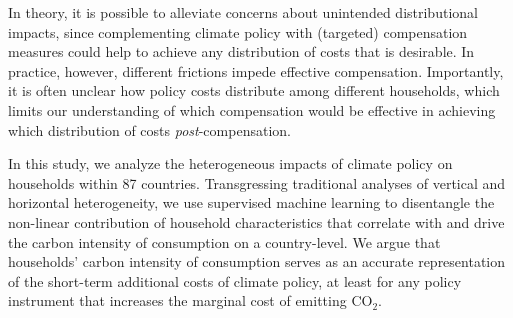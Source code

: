 \documentclass[12pt, a4paper]{article}
\begin{document}
In theory, it is possible to alleviate concerns about unintended distributional impacts, since complementing climate policy with (targeted) compensation measures could help to achieve any distribution of costs that is desirable. In practice, however, different frictions impede effective compensation. Importantly, it is often unclear how policy costs distribute among different households, which limits our understanding of which compensation would be effective in achieving which distribution of costs \textit{post}-compensation.


In this study, we analyze the heterogeneous impacts of climate policy on households within 87 countries. Transgressing traditional analyses of vertical and horizontal heterogeneity, we use supervised machine learning to disentangle the non-linear contribution of household characteristics that correlate with and drive the carbon intensity of consumption on a country-level. We argue that households' carbon intensity of consumption serves as an accurate representation of the short-term additional costs of climate policy, at least for any policy instrument that increases the marginal cost of emitting CO$_{2}$.
\end{document}
